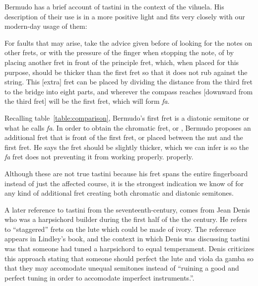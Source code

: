 Bermudo has a brief account of tastini in the context of the vihuela.  His description
of their use is in a more positive light and fits very closely with our modern-day
usage of them:
\begin{blocks}
For faults that may arise, take the advice given before of looking for the notes on other
frets, or with the pressure of the finger when stopping the note, of by placing another
fret in front of the principle fret, which, when placed for this purpose, should be
thicker than the first fret so that it does not rub against the string. This [extra]
fret can be placed by dividing the distance from the third fret to the bridge into eight
parts, and wherever the compass reaches [downward from the third fret] will be the first
fret, which will form \textit{fa}. \autocite[115-116]{DE:1}
\end{blocks}
Recalling table~\ref{table:comparison}, Bermudo's first fret is a diatonic semitone or what
he calls \textit{fa}.  In order to obtain the chromatic fret, or , Bermudo
proposes an additional fret that is front of the first fret, or placed between the nut
and the first fret.  He says the fret should be slightly thicker, which we can infer
is so the \textit{fa} fret does not preventing it from working properly.
properly.

Although these are not true tastini because his fret spans the entire
fingerboard instead of just the affected course, it is the strongest indication we know
of for any kind of additional fret creating both chromatic and diatonic semitones.

A later reference to tastini from the seventeenth-century, comes from Jean Denis who
was a harpsichord builder during the first half of the the century.  He refers to
``staggered'' frets on the lute which could be made of ivory.  The reference appears in
Lindley's book, and the context in which Denis was discussing tastini was that
someone had tuned a harpsichord to equal temperament.  Denis criticizes this approach
stating that someone should perfect the lute and viola da gamba so that they may
accomodate unequal semitones instead of ``ruining a good and perfect tuning in order to
accomodate imperfect instruments.''\autocite[47]{ML:1}.


